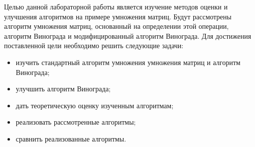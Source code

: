 \Introduction

Целью данной лабораторной работы является изучение методов оценки и улучшения алгоритмов на примере умножения матриц. Будут рассмотрены алгоритм умножения матриц, основанный на определении этой операции, алгоритм Винограда и модифицированный алгоритм Винограда. Для достижения поставленной цели необходимо решить следующие задачи:
\begin{itemize}
    \item изучить стандартный алгоритм умножения умножения матриц и алгоритм Винограда;
    \item улучшить алгоритм Винограда;
    \item дать теоретическую оценку изученным алгоритмам;
    \item реализовать рассмотренные алгоритмы;
    \item сравнить реализованные алгоритмы.
\end{itemize}

